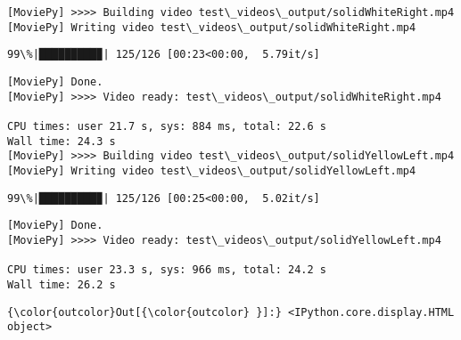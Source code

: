 \documentclass[11pt]{article}
\begin{document}
    \begin{Verbatim}[commandchars=\\\{\}]
[MoviePy] >>>> Building video test\_videos\_output/solidWhiteRight.mp4
[MoviePy] Writing video test\_videos\_output/solidWhiteRight.mp4

    \end{Verbatim}

    \begin{Verbatim}[commandchars=\\\{\}]
 99\%|█████████▉| 125/126 [00:23<00:00,  5.79it/s]

    \end{Verbatim}

    \begin{Verbatim}[commandchars=\\\{\}]
[MoviePy] Done.
[MoviePy] >>>> Video ready: test\_videos\_output/solidWhiteRight.mp4 

CPU times: user 21.7 s, sys: 884 ms, total: 22.6 s
Wall time: 24.3 s
[MoviePy] >>>> Building video test\_videos\_output/solidYellowLeft.mp4
[MoviePy] Writing video test\_videos\_output/solidYellowLeft.mp4

    \end{Verbatim}

    \begin{Verbatim}[commandchars=\\\{\}]
 99\%|█████████▉| 125/126 [00:25<00:00,  5.02it/s]

    \end{Verbatim}

    \begin{Verbatim}[commandchars=\\\{\}]
[MoviePy] Done.
[MoviePy] >>>> Video ready: test\_videos\_output/solidYellowLeft.mp4 

CPU times: user 23.3 s, sys: 966 ms, total: 24.2 s
Wall time: 26.2 s

    \end{Verbatim}

\begin{Verbatim}[commandchars=\\\{\}]
{\color{outcolor}Out[{\color{outcolor} }]:} <IPython.core.display.HTML object>
\end{Verbatim}
            
    \begin{center}
    \end{center}
    { \hspace*{\fill} \\}
    
\end{document}
